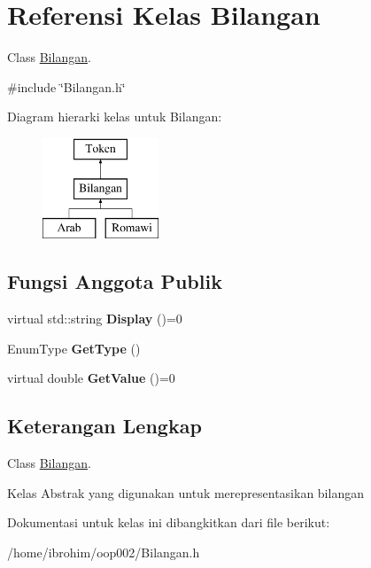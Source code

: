 \hypertarget{classBilangan}{}\section{Referensi Kelas Bilangan}
\label{classBilangan}


Class \hyperlink{classBilangan}{Bilangan}.  




{\ttfamily \#include \char`\"{}Bilangan.\+h\char`\"{}}

Diagram hierarki kelas untuk Bilangan\+:\begin{figure}[H]
\begin{center}
\leavevmode
\includegraphics[height=3.000000cm]{d2/dac/classBilangan}
\end{center}
\end{figure}
\subsection*{Fungsi Anggota Publik}
\begin{DoxyCompactItemize}
\item 
\hypertarget{classBilangan_ab2ee8800f19568a48bf9cc7a2e74bc3d}{}virtual std\+::string {\bfseries Display} ()=0\label{classBilangan_ab2ee8800f19568a48bf9cc7a2e74bc3d}

\item 
\hypertarget{classBilangan_a3bf3d5edae1146c224521ffef88343a5}{}Enum\+Type {\bfseries Get\+Type} ()\label{classBilangan_a3bf3d5edae1146c224521ffef88343a5}

\item 
\hypertarget{classBilangan_a0e5aa4a90d3fe974e806f39ebbf813b9}{}virtual double {\bfseries Get\+Value} ()=0\label{classBilangan_a0e5aa4a90d3fe974e806f39ebbf813b9}

\end{DoxyCompactItemize}


\subsection{Keterangan Lengkap}
Class \hyperlink{classBilangan}{Bilangan}. 

Kelas Abstrak yang digunakan untuk merepresentasikan bilangan 

Dokumentasi untuk kelas ini dibangkitkan dari file berikut\+:\begin{DoxyCompactItemize}
\item 
/home/ibrohim/oop002/Bilangan.\+h\end{DoxyCompactItemize}
